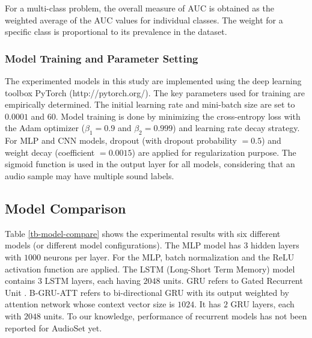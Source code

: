 \documentclass{article}
\begin{document}
For a multi-class problem, the overall measure of AUC is obtained as the weighted average of the AUC values for individual classes. The weight for a specific class is proportional to its prevalence in the dataset.

\subsubsection{Model Training and Parameter Setting}
\label{sssec:trainstrategy}


The experimented models in this study are implemented using the deep learning toolbox PyTorch (http://pytorch.org/). The key parameters used for training are empirically determined. The initial learning rate and mini-batch size are set to $0.0001$ and $60$. Model training is done by minimizing the cross-entropy loss with the Adam optimizer (${\beta _1} = 0.9$ and ${\beta _2} = 0.999$) and learning rate decay strategy. For MLP and CNN models, dropout (with dropout probability $= 0.5$) and weight decay (coefficient $=0.0015$) are applied for regularization purpose. The sigmoid function is used in the output layer for all models, considering that an audio sample may have multiple sound labels.

\subsection{Model Comparison}
\label{ssec:comparemodels}

Table \ref{tb-model-compare} shows the experimental results with six different models (or different model configurations). The MLP model has $3$ hidden layers with $1000$ neurons per layer. For the MLP, batch normalization and the ReLU activation function are applied. The LSTM (Long-Short Term Memory) model contains $3$ LSTM layers, each having $2048$ units. GRU refers to Gated Recurrent Unit \cite{gru}. B-GRU-ATT refers to bi-directional GRU with its output weighted by attention network \cite{Yang2016HierarchicalAN} whose context vector size is $1024$. It has $2$ GRU layers, each with $2048$ units. To our knowledge, performance of recurrent models has not been reported for AudioSet yet.
\end{document}
